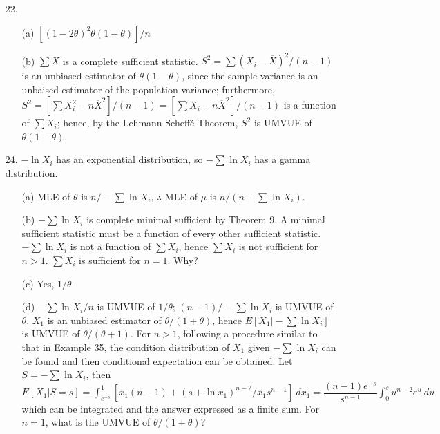 \begin{enumerate}
	\item[22.] \begin{enumerate}
		\item[(a)] $[(1-2\theta)^2\theta(1-\theta)]/n$
		\item[(b)] $\sum X$ is a complete sufficient statistic. $S^2=\sum(X_i-\overline{X})^2/(n-1)$ is an unbiased estimator of $\theta(1-\theta)$, since the sample variance is an unbaised estimator of the population variance; furthermore, $S^2=[\sum X_i^2-n\overline{X}^2]/(n-1) = [\sum X_i -n\overline{X}^2]/(n-1)$ is a function of $\sum X_i$; hence, by the Lehmann-Scheff\'e Theorem, $S^2$ is UMVUE of $\theta(1-\theta)$.  
	\end{enumerate}	
	
	\item[24.] $-\ln X_i$ has an exponential distribution, so $-\sum \ln X_i$ has a gamma distribution.
	\begin{enumerate}
		\item[(a)] MLE of $\theta$ is $n/-\sum \ln X_i$, $\therefore$ MLE of $\mu$ is $n/(n-\sum \ln X_i)$.
		
		\newpage
		
		\item[(b)] $-\sum \ln X_i$ is complete minimal sufficient by Theorem 9.  A minimal sufficient statistic must be a function of every other sufficient statistic. $-\sum \ln X_i$ is not a function of $\sum X_i$, hence $\sum X_i$ is not sufficient for $n>1$. $\sum X_i$ is sufficient for $n=1$. Why?
		\item[(c)] Yes, $1/\theta$.
		\item[(d)] $-\sum \ln X_i/n$ is UMVUE of $1/\theta$; $(n-1)/-\sum \ln X_i$ is UMVUE of $\theta$. $X_1$ is an unbiased estimator of $\theta/(1+\theta)$, hence $E[X_1 \vert -\sum \ln X_i]$ is UMVUE of $\theta/(\theta + 1)$. For $n>1$, following a procedure similar to that in Example 35, the condition distribution of $X_1$ given $-\sum \ln X_i$ can be found and then conditional expectation can be obtained. Let $S = -\sum \ln X_i$, then $E[X_1\vert S=s] = \displaystyle\int_{e^{-s}}^{1} [x_1(n-1) + (s+\ln x_1)^{n-2}/x_1s^{n-1}]\ dx_1 = \dfrac{(n-1)e^{-s}}{s^{n-1}}\int_0^s u^{n-2}e^u\ du$ which can be integrated and the answer expressed as a finite sum. For $n=1$, what is the UMVUE of $\theta/(1+\theta)$?
	\end{enumerate}
	

\end{enumerate}

